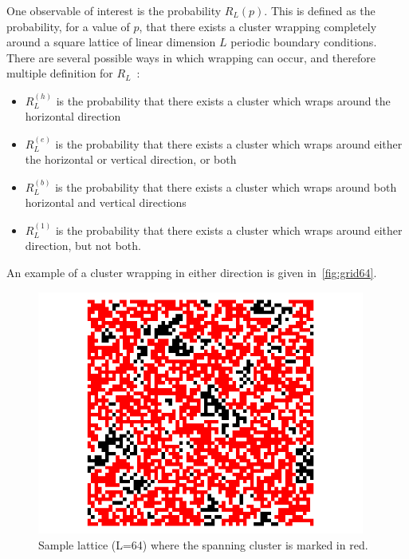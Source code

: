 One observable of interest is the probability $R_L(p)$. This is defined as the probability, for a value of $p$, that there exists a cluster wrapping completely around a square lattice of linear dimension $L$ periodic boundary conditions. There are several possible ways in which wrapping can occur, and therefore multiple definition for $R_L$~\cite{Newman_2001}:
\begin{itemize}
	\item $R_L^{(h)}$ is the probability that there exists a cluster which wraps around the horizontal direction
	\item $R_L^{(e)}$ is the probability that there exists a cluster which wraps around either the horizontal or vertical direction, or both
	\item $R_L^{(b)}$ is the probability that there exists a cluster which wraps around both horizontal and vertical directions
	\item $R_L^{(1)}$ is the probability that there exists a cluster which wraps around either direction, but not both.
\end{itemize}
An example of a cluster wrapping in either direction is given in~\autoref{fig:grid64}.

\begin{figure}
	\centering
		\includegraphics[height=80mm]{../plots/sample64}
		\caption{\label{fig:grid64} Sample lattice (L=64) where the spanning cluster is marked in red.}
\end{figure}

